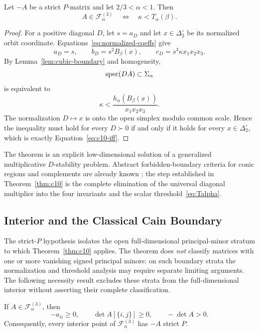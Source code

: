 \begin{Theorem}\label{thm:c10}
Let \(-A\) be a strict \(P\)-matrix and let \(2/3<\alpha<1\). Then
\begin{equation}
\boxed{
A\in\mathcal F_\alpha^{(3)}
\quad\Longleftrightarrow\quad
\kappa<T_\alpha(\beta).
}
\label{eq:c10-iff}
\end{equation}
\end{Theorem}

\begin{proof}
For a positive diagonal \(D\), let \(s=a_D\) and let \(x\in\Delta_2^\circ\) be its normalized orbit coordinate. Equations~\eqref{eq:normalized-coeffs} give
\[
a_D=s,\qquad
b_D=s^2B_\beta(x),\qquad
c_D=s^3\kappa x_1x_2x_3.
\]
By Lemma~\ref{lem:cubic-boundary} and homogeneity,
\[
\operatorname{spec}(DA)\subset\Sigma_\alpha
\]
is equivalent to
\[
\kappa
<
\frac{h_\alpha(B_\beta(x))}{x_1x_2x_3}.
\]
The normalization \(D\mapsto x\) is onto the open simplex modulo common scale. Hence the inequality must hold for every \(D\succ0\) if and only if it holds for every \(x\in\Delta_2^\circ\), which is exactly Equation~\eqref{eq:c10-iff}.
\end{proof}

The theorem is an explicit low-dimensional solution of a generalized multiplicative \(D\)-stability problem. Abstract forbidden-boundary criteria for conic regions and complements are already known \cite{KushelPavaniJDDE}; the step established in Theorem~\ref{thm:c10} is the complete elimination of the universal diagonal multiplier into the four invariants and the scalar threshold~\eqref{eq:Talpha}.

\subsection{Interior and the Classical Cain Boundary}

The strict-\(P\) hypothesis isolates the open full-dimensional principal-minor stratum to which Theorem~\ref{thm:c10} applies. The theorem does \emph{not} classify matrices with one or more vanishing signed principal minors: on such boundary strata the normalization and threshold analysis may require separate limiting arguments. The following necessity result excludes these strata from the full-dimensional interior without asserting their complete classification.

\begin{Lemma}\label{lem:P0}
If \(A\in\mathcal F_\alpha^{(3)}\), then
\[
-a_{ii}\ge0,\qquad
\det A[\{i,j\}]\ge0,\qquad
-\det A>0.
\]
Consequently, every interior point of \(\mathcal F_\alpha^{(3)}\) has \(-A\) strict \(P\).
\end{Lemma}

